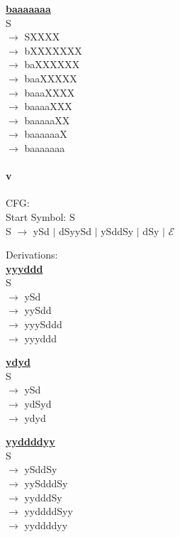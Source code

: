 \documentclass[10pt,letter]{article}
\begin{document}
\textbf{\underline{baaaaaaa}} \\
S \\
$\rightarrow$ SXXXX \\
$\rightarrow$ bXXXXXXX \\
$\rightarrow$ baXXXXXX \\
$\rightarrow$ baaXXXXX \\
$\rightarrow$ baaaXXXX \\
$\rightarrow$ baaaaXXX \\
$\rightarrow$ baaaaaXX \\
$\rightarrow$ baaaaaaX \\
$\rightarrow$ baaaaaaa 

\paragraph{v} CFG: \\
Start Symbol: S \\
S $\rightarrow$ ySd $\mid$ dSyySd $\mid$ ySddSy $\mid$ dSy $\mid$ $\mathcal{E}$

Derivations: \\
\textbf{\underline{yyyddd}} \\
S \\
$\rightarrow$ ySd \\
$\rightarrow$ yySdd \\
$\rightarrow$ yyySddd \\
$\rightarrow$ yyyddd

\textbf{\underline{ydyd}} \\
S \\
$\rightarrow$ ySd \\
$\rightarrow$ ydSyd \\
$\rightarrow$ ydyd

\textbf{\underline{yyddddyy}} \\
S \\
$\rightarrow$ ySddSy \\
$\rightarrow$ yySdddSy \\
$\rightarrow$ yydddSy \\
$\rightarrow$ yyddddSyy \\
$\rightarrow$ yyddddyy
\end{document}
